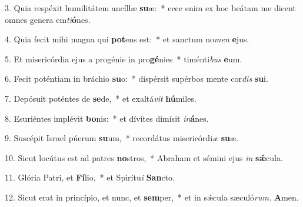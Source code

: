\item 3. Quia respéxit humilitátem ancíllæ \textbf{su}æ:~* ecce enim ex hoc beátam me dicent omnes genera em\textit{ti}\textbf{ó}nes.

\item 4. Quia fecit mihi magna qui \textbf{pot}ens est:~* et sanctum no\textit{men} \textbf{e}jus.

\item 5. Et misericórdia ejus a progénie in pro\textbf{gé}nies~* timénti\textit{bus} \textbf{e}um.

\item 6. Fecit poténtiam in bráchio \textbf{su}o:~* dispérsit supérbos mente cor\textit{dis} \textbf{su}i.

\item 7. Depósuit poténtes de \textbf{se}de,~* et exaltá\textit{vit} \textbf{hú}miles.

\item 8. Esuriéntes implévit \textbf{bo}nis:~* et dívites dimísit \textit{in}\textbf{á}nes.

\item 9. Suscépit Israel púerum \textbf{su}um,~* recordátus misericórdi\hspace{0.03em}\textit{æ} \textbf{su}æ.

\item 10. Sicut locútus est ad patres \textbf{no}stros,~* Abraham et sémini ejus \textit{in} \textbf{sǽ}cula.

\item 11. Glória Patri, et \textbf{Fí}lio,~* et Spirítu\hspace{0.03em}\textit{i} \textbf{San}cto.

\item 12. Sicut erat in princípio, et nunc, et \textbf{sem}per,~* et in sǽcula sæculó\textit{rum.} \textbf{A}men.